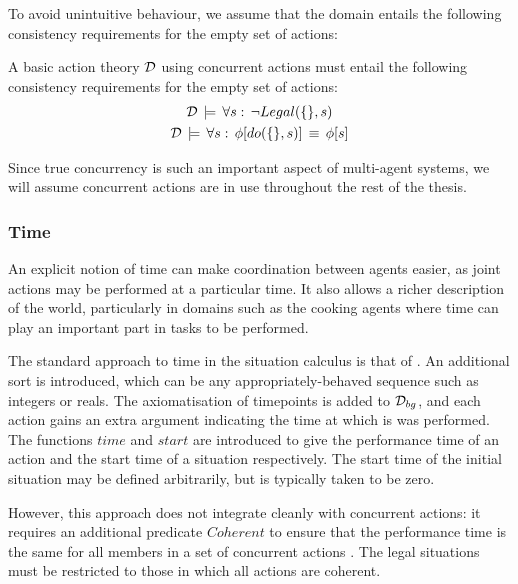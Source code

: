 To avoid unintuitive behaviour, we assume that the domain entails
the following consistency requirements for the empty set of actions:

\begin{defnL}
 A basic action theory $\mathcal{D}$
using concurrent actions must entail the following consistency requirements
for the empty set of actions:\begin{gather*}
\mathcal{D}\,\models\,\forall s:\,\neg Legal(\{\},s)\\
\mathcal{D}\,\models\,\forall s:\,\phi[do(\{\},s)]\,\equiv\,\phi[s]\end{gather*}

\end{defnL}
Since true concurrency is such an important aspect of multi-agent
systems, we will assume concurrent actions are in use throughout the
rest of the thesis.


\subsubsection{Time}

\label{sec:Background:Time}

An explicit notion of time can make coordination between agents easier,
as joint actions may be performed at a particular time. It also allows
a richer description of the world, particularly in domains such as
the cooking agents where time can play an important part in tasks
to be performed.

The standard approach to time in the situation calculus is that of
\citep{pinto94temporal,pinto95reasoning_time,reiter96sc_nat_conc}.
An additional sort  is introduced, which can be any
appropriately-behaved sequence such as integers or reals. The axiomatisation
of timepoints is added to $\mathcal{D}_{bg}$, and each action gains an extra
argument indicating the time at which is was performed. The functions
$time$ and $start$ are introduced to give the performance time of
an action and the start time of a situation respectively. The start
time of the initial situation may be defined arbitrarily, but is typically
taken to be zero.

However, this approach does not integrate cleanly with concurrent
actions: it requires an additional predicate $Coherent$ to ensure
that the performance time is the same for all members in a set of
concurrent actions \citep{reiter96sc_nat_conc}. The legal situations
must be restricted to those in which all actions are coherent.

